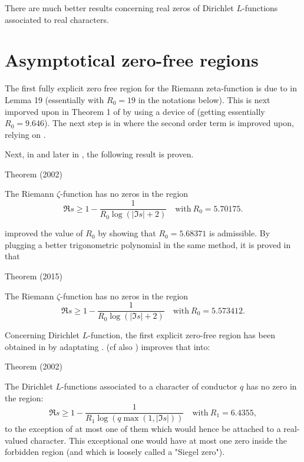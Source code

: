 There are much better results concerning real zeros of Dirichlet $L$-functions
    associated to real characters.


\section{Asymptotical zero-free regions}


The first fully explicit zero free region for the Riemann zeta-function is due
to \cite{Rosser*38} in Lemma 19 (essentially
with $R_0=19$ in the notations below). This is next imporved upon in Theorem 1
of \cite{Rosser-Schoenfeld*75}
by using a device of
\cite{Stechkin*70} (getting
essentially $R_0=9.646$).
The next step is in
\cite{Ramare-Rumely*96} 
where the second order term is improved upon, relying on
\cite{Stechkin*89}.

Next, in
\cite{Kadiri*02}
and later in
\cite{Kadiri*05},
the following result is proven.

\begin{thm}{Theorem (2002)}

  The Riemann $\zeta$-function has no zeros in the region
  $$
    \Re s \ge 1- \frac1{R_0 \log (| \Im s|+2)}\quad\text{with}\  R_0=5.70175.
  $$
\end{thm}



\cite{Jang-Kwon*14}
improved the value of $R_0$ by showing that $R_0=5.68371$ is admissible.
By plugging a better trigonometric polynomial in the same method,
it is proved in
\cite{Mossinghoff-Trudgian*15}
that

\begin{thm}{Theorem (2015)}

  The Riemann $\zeta$-function has no zeros in the region
  $$
    \Re s \ge 1- \frac1{R_0 \log (| \Im s|+2)}\quad\text{with}\  R_0=5.573412.
  $$
\end{thm}


Concerning Dirichlet $L$-function, the first explicit zero-free region has been obtained in
\cite{McCurley*84-1} by adaptating
\cite{Rosser-Schoenfeld*75}.
\cite{Kadiri*02} (cf also
\cite{Kadiri*02-2})
improves that into:

\begin{thm}{Theorem (2002)}

  The Dirichlet $L$-functions associated to a character of conductor $q$ has
  no zero in the region:
  $$
    \Re s \ge 1- \frac1{R_1 \log(q \max(1,| \Im s|))}  \quad\text{with}\
    R_1=6.4355, 
  $$
  to the exception of at most one of them which would hence be attached to a
  real-valued character. This exceptional one would have at most one zero
  inside the forbidden region (and which is loosely called a "Siegel zero").
\end{thm}

